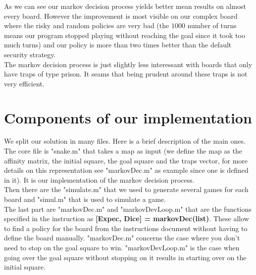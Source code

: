 \documentclass{eplDoc}
\begin{document}
As we can see our markov decision process yields better mean results on almost every board. However the improvement is most visible on our complex board where the risky and random policies are very bad (the $1000$ number of turns means our program stopped playing without reaching the goal since it took too much turns) and our policy is more than two times better than the default security strategy. \\
The markov decision process is just slightly less interessant with boards that only have traps of type prison.  It seams that being prudent around these traps is not very efficient. 
\section{Components of our implementation}

We split our solution in many files. Here is a brief description of the main ones. \\ 
The core file is "snake.m" that takes a map as input (we define the map as the affinity matrix, the initial square, the goal square and the traps vector, for more details on this representation see "markovDec.m" as example since one is defined in it). It is our implementation of the markov decision process.  \\ 
Then there are the "simulate.m" that we used to generate several games for each board and "simul.m" that is used to simulate a game. \\ 
The last part are "markovDec.m" and "markovDevLoop.m" that are the functions specified in the instruction as \textbf{[Expec, Dice] = markovDec(list)}. These allow to find a policy for the board from the instructions document without having to define the board manually. "markovDec.m" concerns the case where you don't need to stop on the goal square to win. "markovDevLoop.m" is the case when going over the goal square without stopping on it results in starting over on the initial square. 
\end{document}
